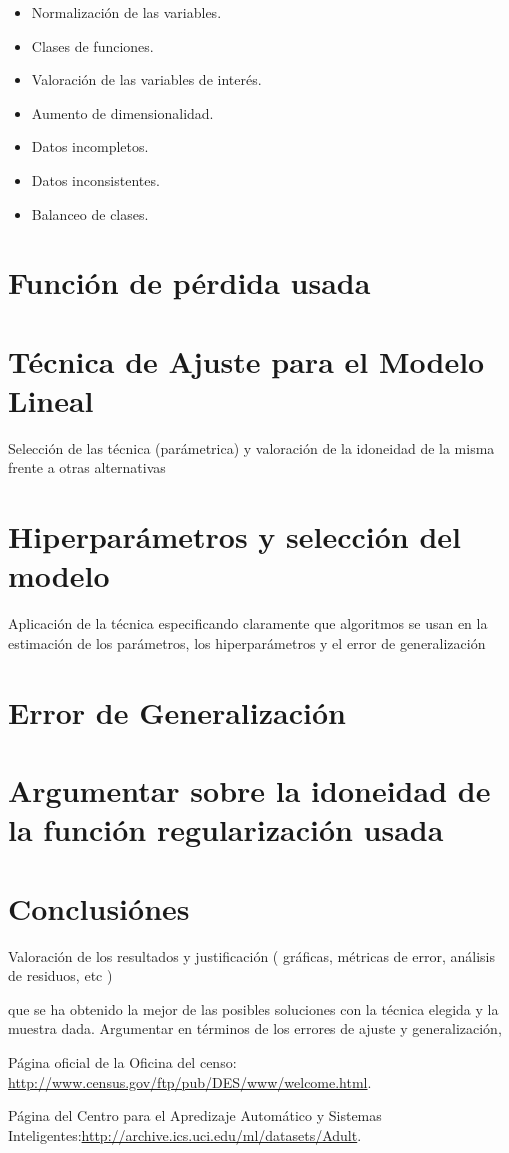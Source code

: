 \documentclass[11pt,a4paper]{article}
\begin{document}
\begin{itemize}

	\item Normalización de las variables.
	\item Clases de funciones.
	\item Valoración de las variables de interés.
	\item Aumento de dimensionalidad.
	\item Datos incompletos.
	\item Datos inconsistentes.
	\item Balanceo de clases.
\end{itemize}
\section{ Función de pérdida usada}
\section{ Técnica de Ajuste para el Modelo Lineal}
Selección de las técnica (parámetrica) y valoración de la idoneidad de la misma frente a otras alternativas
\section{Hiperparámetros y selección del modelo}
 Aplicación de la técnica especificando claramente que algoritmos se usan en la estimación de los parámetros, los hiperparámetros y el error de generalización

\section{ Error de Generalización}
\section{ Argumentar sobre la idoneidad de la función regularización usada }
\section{ Conclusiónes }
Valoración de los resultados y justificación 
( gráficas, métricas de error, análisis de residuos, etc )


que se ha obtenido la mejor de las posibles soluciones con la técnica elegida y la muestra dada. Argumentar en términos de los errores de ajuste y generalización,


\newpage
\begin{thebibliography}{9}
Página oficial de la Oficina del censo: \url{http://www.census.gov/ftp/pub/DES/www/welcome.html}.

Página del Centro para el Apredizaje Automático y Sistemas Inteligentes:\url{http://archive.ics.uci.edu/ml/datasets/Adult}.
\end{thebibliography}
\end{document}
